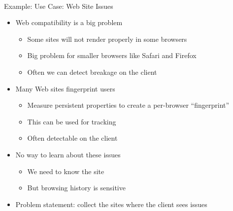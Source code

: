 \documentclass[helvetica]{beamer}
\begin{document}
\begin{frame}{Example: Use Case: Web Site Issues}

  \begin{itemize}
  \item Web compatibility is a big problem
    \begin{itemize}
    \item Some sites will not render properly in some browsers
    \item Big problem for smaller browsers like Safari and Firefox
    \item Often we can detect breakage on the client      
    \end{itemize}
    
  \item Many Web sites fingerprint users
    \begin{itemize}
    \item Measure persistent properties to create a per-browser ``fingerprint''
    \item This can be used for tracking
    \item Often detectable on the client
    \end{itemize}

  \item No way to learn about these issues
    \begin{itemize}
    \item We need to know the site
    \item But browsing history is sensitive      
    \end{itemize}

  \item Problem statement: collect the sites where the client sees issues
  \end{itemize}
\end{frame}
\end{document}
